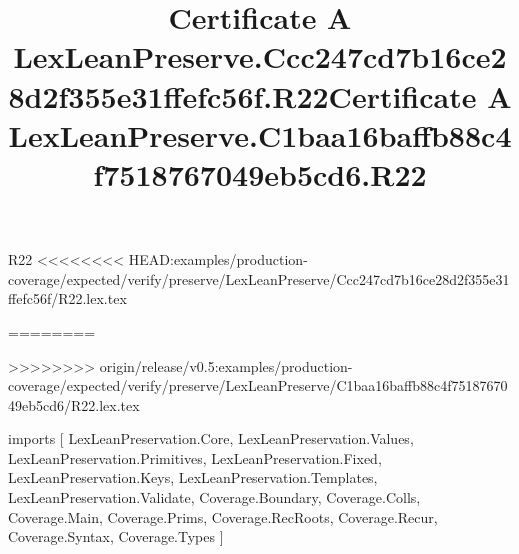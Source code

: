\begin{lexlean}{R22}
<<<<<<<< HEAD:examples/production-coverage/expected/verify/preserve/LexLeanPreserve/Ccc247cd7b16ce28d2f355e31ffefc56f/R22.lex.tex
\title{Certificate A LexLeanPreserve.Ccc247cd7b16ce28d2f355e31ffefc56f.R22}
========
\title{Certificate A LexLeanPreserve.C1baa16baffb88c4f7518767049eb5cd6.R22}
>>>>>>>> origin/release/v0.5:examples/production-coverage/expected/verify/preserve/LexLeanPreserve/C1baa16baffb88c4f7518767049eb5cd6/R22.lex.tex
\begin{coremodule}
imports [
  LexLeanPreservation.Core,
  LexLeanPreservation.Values,
  LexLeanPreservation.Primitives,
  LexLeanPreservation.Fixed,
  LexLeanPreservation.Keys,
  LexLeanPreservation.Templates,
  LexLeanPreservation.Validate,
  Coverage.Boundary,
  Coverage.Colls,
  Coverage.Main,
  Coverage.Prims,
  Coverage.RecRoots,
  Coverage.Recur,
  Coverage.Syntax,
  Coverage.Types
]


\end{coremodule}
\end{lexlean}
